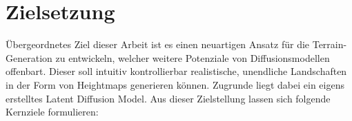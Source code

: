 \section{Zielsetzung}
\label{sec:Zielsetzung}

Übergeordnetes Ziel dieser Arbeit ist es einen neuartigen Ansatz für die Terrain-Generation zu entwickeln, welcher weitere Potenziale von Diffusionsmodellen offenbart. Dieser soll intuitiv kontrollierbar realistische, unendliche Landschaften in der Form von Heightmaps generieren können. Zugrunde liegt dabei ein eigens erstelltes Latent Diffusion Model. Aus dieser Zielstellung lassen sich folgende Kernziele formulieren:

